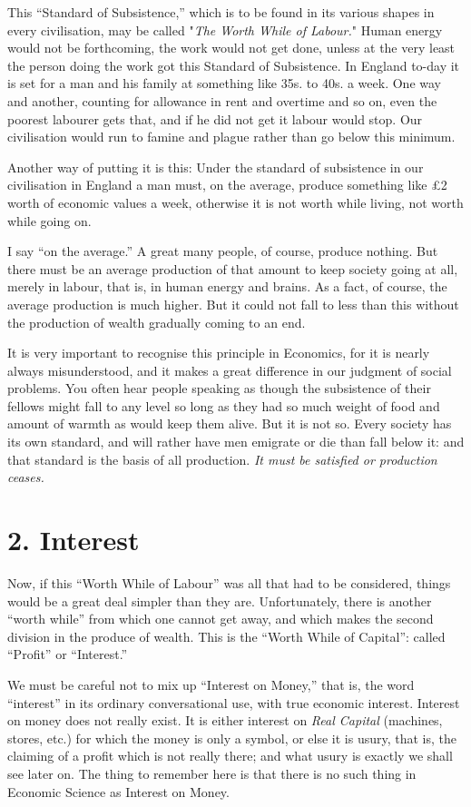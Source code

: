 \documentclass{book}
\begin{document}
This “Standard of Subsistence,” which is to be found in its various shapes in every civilisation, may be called "\emph{The Worth While of Labour.}" Human energy would not be forthcoming, the work would not get done, unless at the very least the person doing the work got this Standard of Subsistence. In England to-day it is set for a man and his family at something like 35s. to 40s. a week. One way and another, counting for allowance in rent and overtime and so on, even the poorest labourer gets that, and if he did not get it labour would stop. Our civilisation would run to famine and plague rather than go below this minimum.

Another way of putting it is this: Under the standard of subsistence in our civilisation in England a man must, on the average, produce something like £2 worth of economic values a week, otherwise it is not worth while living, not worth while going on.

I say “on the average.” A great many people, of course, produce nothing. But there must be an average production of that amount to keep society going at all, merely in labour, that is, in human energy and brains. As a fact, of course, the average production is much higher. But it could not fall to less than this without the production of wealth gradually coming to an end.

It is very important to recognise this principle in Economics, for it is nearly always misunderstood, and it makes a great difference in our judgment of social problems. You often hear people speaking as though the subsistence of their fellows might fall to any level so long as they had so much weight of food and amount of warmth as would keep them alive. But it is not so. Every society has its own standard, and will rather have men emigrate or die than fall below it: and that standard is the basis of all production. \emph{It must be satisfied or production ceases.}

\section{2. Interest}
Now, if this “Worth While of Labour” was all that had to be considered, things would be a great deal simpler than they are. Unfortunately, there is another “worth while” from which one cannot get away, and which makes the second division in the produce of wealth. This is the “Worth While of Capital”: called “Profit” or “Interest.”

We must be careful not to mix up “Interest on Money,” that is, the word “interest” in its ordinary conversational use, with true economic interest. Interest on money does not really exist. It is either interest on \emph{Real Capital} (machines, stores, etc.) for which the money is only a symbol, or else it is usury, that is, the claiming of a profit which is not really there; and what usury is exactly we shall see later on. The thing to remember here is that there is no such thing in Economic Science as Interest on Money.
\end{document}

